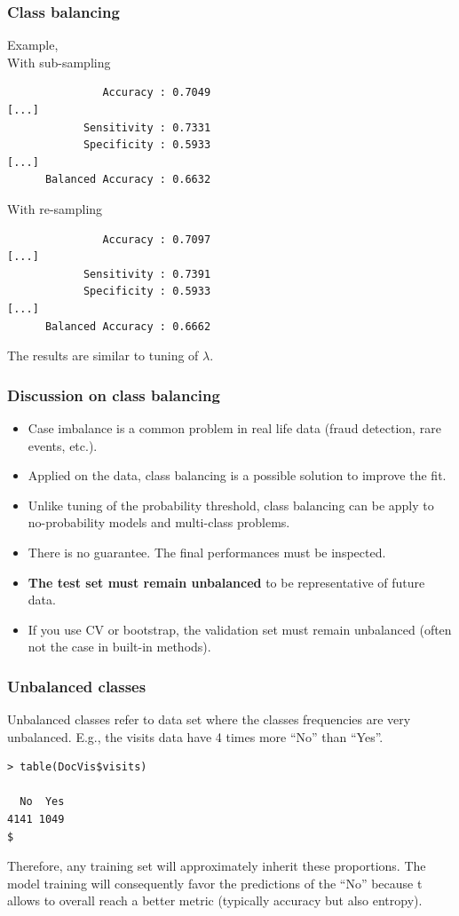 \begin{frame}[fragile]
\frametitle{Class balancing}
Example,\\
\vspace{0.2cm}
\scriptsize
With sub-sampling
\begin{verbatim}
               Accuracy : 0.7049          
[...]
            Sensitivity : 0.7331          
            Specificity : 0.5933          
[...]
      Balanced Accuracy : 0.6632          
\end{verbatim}
With re-sampling
\begin{verbatim}
               Accuracy : 0.7097       
[...]
            Sensitivity : 0.7391          
            Specificity : 0.5933          
[...]
      Balanced Accuracy : 0.6662          
\end{verbatim}
The results are similar to tuning of $\lambda$.
\end{frame}
\begin{frame}
\frametitle{Discussion on class balancing}
\begin{itemize}
\item Case imbalance is a common problem in real life data (fraud detection, rare events, etc.).
\item Applied on the data, class balancing is a possible solution to improve the fit.
\item Unlike tuning of the probability threshold, class balancing can be apply to no-probability models and multi-class problems.
\item There is no guarantee. The final performances must be inspected.
\item {\bf The test set must remain unbalanced} to be representative of future data.
\item If you use CV or bootstrap, the validation set must remain unbalanced (often not the case in built-in methods). 
\end{itemize}
\end{frame}


\begin{frame}[fragile]
\frametitle{Unbalanced classes}
Unbalanced classes refer to data set where the classes frequencies are very unbalanced. E.g., the visits data have 4 times more ``No'' than ``Yes''.\\
\scriptsize
\begin{verbatim}
> table(DocVis$visits)

  No  Yes 
4141 1049                                                                                                                        $
\end{verbatim}
\normalsize
Therefore, any training set will approximately inherit these proportions. The model training will consequently favor the predictions of the ``No'' because t allows to overall reach a better metric (typically accuracy but also entropy). 
\end{frame}

